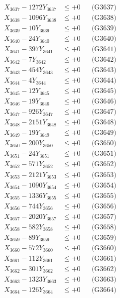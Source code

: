 \documentclass[a4paper,10pt]{article}
\begin{document}
{\begin{align}
X_{3637} - 1272Y_{3637} &\leq +0 && \text{(G3637)} \\
X_{3638} - 1096Y_{3638} &\leq +0 && \text{(G3638)} \\
X_{3639} - 10Y_{3639} &\leq +0 && \text{(G3639)} \\
X_{3640} - 24Y_{3640} &\leq +0 && \text{(G3640)} \\
\allowbreak
X_{3641} - 397Y_{3641} &\leq +0 && \text{(G3641)} \\
X_{3642} - 7Y_{3642} &\leq +0 && \text{(G3642)} \\
X_{3643} - 454Y_{3643} &\leq +0 && \text{(G3643)} \\
X_{3644} - 4Y_{3644} &\leq +0 && \text{(G3644)} \\
X_{3645} - 12Y_{3645} &\leq +0 && \text{(G3645)} \\
X_{3646} - 19Y_{3646} &\leq +0 && \text{(G3646)} \\
X_{3647} - 926Y_{3647} &\leq +0 && \text{(G3647)} \\
X_{3648} - 2151Y_{3648} &\leq +0 && \text{(G3648)} \\
X_{3649} - 19Y_{3649} &\leq +0 && \text{(G3649)} \\
X_{3650} - 200Y_{3650} &\leq +0 && \text{(G3650)} \\
\allowbreak
X_{3651} - 24Y_{3651} &\leq +0 && \text{(G3651)} \\
X_{3652} - 571Y_{3652} &\leq +0 && \text{(G3652)} \\
X_{3653} - 2121Y_{3653} &\leq +0 && \text{(G3653)} \\
X_{3654} - 1090Y_{3654} &\leq +0 && \text{(G3654)} \\
X_{3655} - 1336Y_{3655} &\leq +0 && \text{(G3655)} \\
X_{3656} - 744Y_{3656} &\leq +0 && \text{(G3656)} \\
X_{3657} - 2020Y_{3657} &\leq +0 && \text{(G3657)} \\
X_{3658} - 582Y_{3658} &\leq +0 && \text{(G3658)} \\
X_{3659} - 89Y_{3659} &\leq +0 && \text{(G3659)} \\
X_{3660} - 572Y_{3660} &\leq +0 && \text{(G3660)} \\
\allowbreak
X_{3661} - 112Y_{3661} &\leq +0 && \text{(G3661)} \\
X_{3662} - 301Y_{3662} &\leq +0 && \text{(G3662)} \\
X_{3663} - 1323Y_{3663} &\leq +0 && \text{(G3663)} \\
X_{3664} - 126Y_{3664} &\leq +0 && \text{(G3664)} \\

\end{align}}
\end{document}
